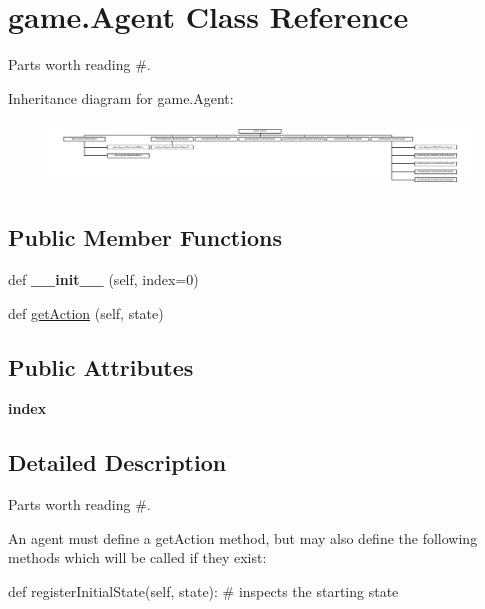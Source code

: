 \hypertarget{classgame_1_1_agent}{}\section{game.\+Agent Class Reference}
\label{classgame_1_1_agent}


Parts worth reading \#.  


Inheritance diagram for game.\+Agent\+:\begin{figure}[H]
\begin{center}
\leavevmode
\includegraphics[height=1.770551cm]{classgame_1_1_agent}
\end{center}
\end{figure}
\subsection*{Public Member Functions}
\begin{DoxyCompactItemize}
\item 
\mbox{\label{classgame_1_1_agent_aee5fbd6b9e05432c2d47051c516b9ae6}} 
def {\bfseries \+\_\+\+\_\+init\+\_\+\+\_\+} (self, index=0)
\item 
def \hyperlink{classgame_1_1_agent_a6de8008ed3294dd312ecb45a32f63084}{get\+Action} (self, state)
\end{DoxyCompactItemize}
\subsection*{Public Attributes}
\begin{DoxyCompactItemize}
\item 
\mbox{\label{classgame_1_1_agent_a171e9f5f634b834d4aa33c1120851235}} 
{\bfseries index}
\end{DoxyCompactItemize}


\subsection{Detailed Description}
Parts worth reading \#. 

\begin{DoxyVerb}An agent must define a getAction method, but may also define the
following methods which will be called if they exist:

def registerInitialState(self, state): # inspects the starting state
\end{DoxyVerb}
 

